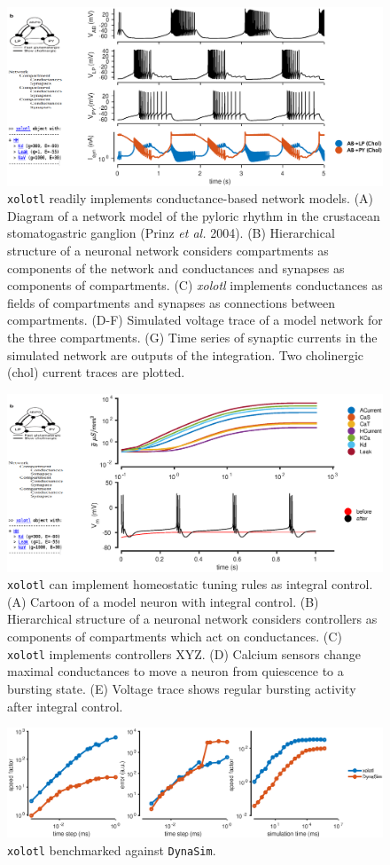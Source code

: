 \documentclass{frontiersSCNS} %
\begin{document}
\begin{figure}
	\centering
	\includegraphics[width=1.0\linewidth]{gfx/figure_network}
	\caption{\texttt{xolotl} readily implements conductance-based network models. (A) Diagram of a network model of the pyloric rhythm in the crustacean stomatogastric ganglion (Prinz \textit{et al.} 2004). (B) Hierarchical structure of a neuronal network considers compartments as components of the network and conductances and synapses as components of compartments. (C) \textit{xolotl} implements conductances as fields of compartments and synapses as connections between compartments. (D-F) Simulated voltage trace of a model network for the three compartments. (G) Time series of synaptic currents in the simulated network are outputs of the integration. Two cholinergic (chol) current traces are plotted.}
	\label{fig:figurenetwork}
\end{figure}

\begin{figure}
	\centering
	\includegraphics[width=1.0\linewidth]{gfx/figure_integral_control}
	\caption{\texttt{xolotl} can implement homeostatic tuning rules as integral control. (A) Cartoon of a model neuron with integral control. (B) Hierarchical structure of a neuronal network considers controllers as components of compartments which act on conductances. (C) \texttt{xolotl} implements controllers XYZ. (D) Calcium sensors change maximal conductances to move a neuron from quiescence to a bursting state. (E) Voltage trace shows regular bursting activity after integral control.}
	\label{fig:figureintegralcontrol}
\end{figure}

\begin{figure}
	\centering
	\includegraphics[width=1.0\linewidth]{gfx/figure_benchmark}
	\caption{\texttt{xolotl} benchmarked against \texttt{DynaSim}.}
	\label{fig:figurebenchmark}
\end{figure}
\end{document}
